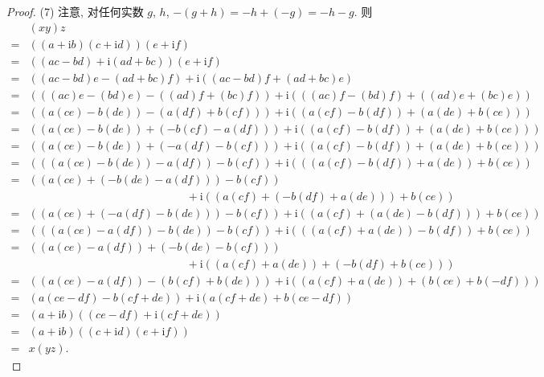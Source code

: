 \documentclass[../libro.tex]{subfiles}
\begin{document}
\begin{proof}
    (7)
    注意,
    对任何实数 \(g\), \(h\),
    \(-(g + h) = -h + (-g) = -h - g\).
    则
    \begin{align*}
        &
        (x y) z
        \\
        = {} &
        ((a + \mathrm{i} b) (c + \mathrm{i} d))
        (e + \mathrm{i} f)
        \\
        = {} &
        ((ac - bd) + \mathrm{i} (ad + bc))
        (e + \mathrm{i} f)
        \\
        = {} &
        ((ac - bd)e - (ad + bc)f)
        + \mathrm{i} ((ac - bd)f + (ad + bc)e)
        \\
        = {} &
        (((ac)e - (bd)e) - ((ad)f + (bc)f))
        + \mathrm{i} (((ac)f - (bd)f) + ((ad)e + (bc)e))
        \\
        = {} &
        ((a(ce) - b(de)) - (a(df) + b(cf)))
        + \mathrm{i} ((a(cf) - b(df)) + (a(de) + b(ce)))
        \\
        = {} &
        ((a(ce) - b(de)) + (-b(cf) - a(df)))
        + \mathrm{i} ((a(cf) - b(df)) + (a(de) + b(ce)))
        \\
        = {} &
        ((a(ce) - b(de)) + (-a(df) - b(cf)))
        + \mathrm{i} ((a(cf) - b(df)) + (a(de) + b(ce)))
        \\
        = {} &
        (((a(ce) - b(de)) - a(df)) - b(cf))
        + \mathrm{i} (((a(cf) - b(df)) + a(de)) + b(ce))
        \\
        = {} &
        ((a(ce) + (-b(de) - a(df))) - b(cf))
        \\
        &
        \quad \quad \quad \quad \quad \quad \quad
        \quad \quad \quad \quad \quad \quad \quad
        + \mathrm{i} ((a(cf) + (-b(df) + a(de))) + b(ce))
        \\
        = {} &
        ((a(ce) + (-a(df) - b(de))) - b(cf))
        + \mathrm{i} ((a(cf) + (a(de) - b(df))) + b(ce))
        \\
        = {} &
        (((a(ce) - a(df)) - b(de)) - b(cf))
        + \mathrm{i} (((a(cf) + a(de)) - b(df)) + b(ce))
        \\
        = {} &
        ((a(ce) - a(df)) + (-b(de) - b(cf)))
        \\
        &
        \quad \quad \quad \quad \quad \quad \quad
        \quad \quad \quad \quad \quad \quad \quad
        + \mathrm{i} ((a(cf) + a(de)) + (-b(df) + b(ce)))
        \\
        = {} &
        ((a(ce) - a(df)) - (b(cf) + b(de)))
        + \mathrm{i} ((a(cf) + a(de)) + (b(ce) + b(-df)))
        \\
        = {} &
        (a(ce - df) - b(cf + de))
        + \mathrm{i} (a(cf + de) + b(ce - df))
        \\
        = {} &
        (a + \mathrm{i} b)
        ((ce - df) + \mathrm{i} (cf + de))
        \\
        = {} &
        (a + \mathrm{i} b)
        ((c + \mathrm{i} d) (e + \mathrm{i} f))
        \\
        = {} &
        x (y z).
    \end{align*}


\end{proof}
\end{document}
